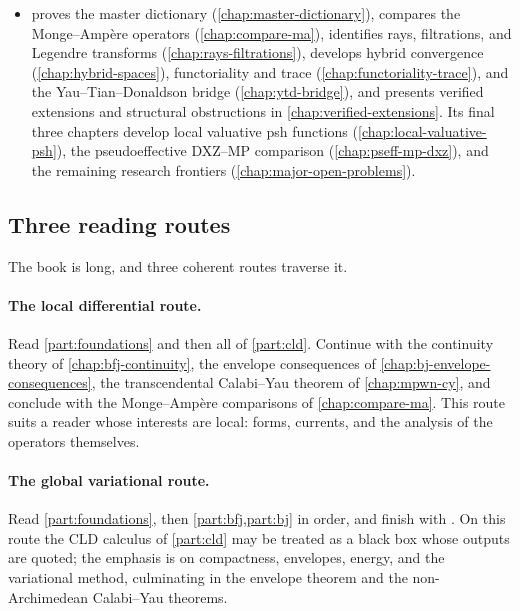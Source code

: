 \begin{itemize}
\item {} proves the master dictionary
(\cref{chap:master-dictionary}), compares the Monge--Amp\`ere operators
(\cref{chap:compare-ma}), identifies rays, filtrations, and Legendre
transforms (\cref{chap:rays-filtrations}), develops hybrid convergence
(\cref{chap:hybrid-spaces}), functoriality and trace
(\cref{chap:functoriality-trace}), and the Yau--Tian--Donaldson bridge
(\cref{chap:ytd-bridge}), and presents verified extensions and structural
obstructions in \cref{chap:verified-extensions}.  Its final three chapters
develop local valuative psh functions
(\cref{chap:local-valuative-psh}), the pseudoeffective DXZ--MP comparison
(\cref{chap:pseff-mp-dxz}), and the remaining research frontiers
(\cref{chap:major-open-problems}).
\end{itemize}

\subsection{Three reading routes}
\label{sec:ch01-reading-routes}

The book is long, and three coherent routes traverse it.

\paragraph{The local differential route.}
Read \cref{part:foundations} and then all of \cref{part:cld}.  Continue
with the continuity theory of \cref{chap:bfj-continuity}, the envelope
consequences of \cref{chap:bj-envelope-consequences}, the transcendental
Calabi--Yau theorem of \cref{chap:mpwn-cy}, and conclude with the
Monge--Amp\`ere comparisons of \cref{chap:compare-ma}.  This route suits a
reader whose interests are local: forms, currents, and the analysis of the
operators themselves.

\paragraph{The global variational route.}
Read \cref{part:foundations}, then \cref{part:bfj,part:bj} in order, and
finish with .  On this route the
CLD calculus of \cref{part:cld} may be treated as a black box whose outputs
are quoted; the emphasis is on compactness, envelopes, energy, and the
variational method, culminating in the envelope theorem and the
non-Archimedean Calabi--Yau theorems.

